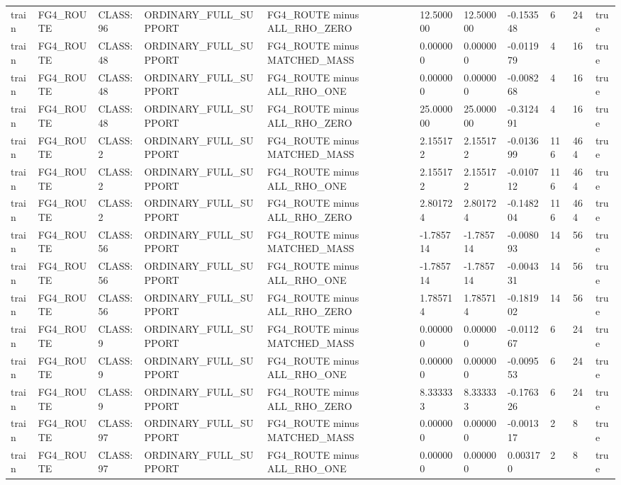 \begin{tabular}{lllllllllll}
train & FG4\_ROUTE & CLASS:96 & ORDINARY\_FULL\_SUPPORT & FG4\_ROUTE minus ALL\_RHO\_ZERO & 12.500000 & 12.500000 & -0.153548 & 6 & 24 & true \\
train & FG4\_ROUTE & CLASS:48 & ORDINARY\_FULL\_SUPPORT & FG4\_ROUTE minus MATCHED\_MASS & 0.000000 & 0.000000 & -0.011979 & 4 & 16 & true \\
train & FG4\_ROUTE & CLASS:48 & ORDINARY\_FULL\_SUPPORT & FG4\_ROUTE minus ALL\_RHO\_ONE & 0.000000 & 0.000000 & -0.008268 & 4 & 16 & true \\
train & FG4\_ROUTE & CLASS:48 & ORDINARY\_FULL\_SUPPORT & FG4\_ROUTE minus ALL\_RHO\_ZERO & 25.000000 & 25.000000 & -0.312491 & 4 & 16 & true \\
train & FG4\_ROUTE & CLASS:2 & ORDINARY\_FULL\_SUPPORT & FG4\_ROUTE minus MATCHED\_MASS & 2.155172 & 2.155172 & -0.013699 & 116 & 464 & true \\
train & FG4\_ROUTE & CLASS:2 & ORDINARY\_FULL\_SUPPORT & FG4\_ROUTE minus ALL\_RHO\_ONE & 2.155172 & 2.155172 & -0.010712 & 116 & 464 & true \\
train & FG4\_ROUTE & CLASS:2 & ORDINARY\_FULL\_SUPPORT & FG4\_ROUTE minus ALL\_RHO\_ZERO & 2.801724 & 2.801724 & -0.148204 & 116 & 464 & true \\
train & FG4\_ROUTE & CLASS:56 & ORDINARY\_FULL\_SUPPORT & FG4\_ROUTE minus MATCHED\_MASS & -1.785714 & -1.785714 & -0.008093 & 14 & 56 & true \\
train & FG4\_ROUTE & CLASS:56 & ORDINARY\_FULL\_SUPPORT & FG4\_ROUTE minus ALL\_RHO\_ONE & -1.785714 & -1.785714 & -0.004331 & 14 & 56 & true \\
train & FG4\_ROUTE & CLASS:56 & ORDINARY\_FULL\_SUPPORT & FG4\_ROUTE minus ALL\_RHO\_ZERO & 1.785714 & 1.785714 & -0.181902 & 14 & 56 & true \\
train & FG4\_ROUTE & CLASS:9 & ORDINARY\_FULL\_SUPPORT & FG4\_ROUTE minus MATCHED\_MASS & 0.000000 & 0.000000 & -0.011267 & 6 & 24 & true \\
train & FG4\_ROUTE & CLASS:9 & ORDINARY\_FULL\_SUPPORT & FG4\_ROUTE minus ALL\_RHO\_ONE & 0.000000 & 0.000000 & -0.009553 & 6 & 24 & true \\
train & FG4\_ROUTE & CLASS:9 & ORDINARY\_FULL\_SUPPORT & FG4\_ROUTE minus ALL\_RHO\_ZERO & 8.333333 & 8.333333 & -0.176326 & 6 & 24 & true \\
train & FG4\_ROUTE & CLASS:97 & ORDINARY\_FULL\_SUPPORT & FG4\_ROUTE minus MATCHED\_MASS & 0.000000 & 0.000000 & -0.001317 & 2 & 8 & true \\
train & FG4\_ROUTE & CLASS:97 & ORDINARY\_FULL\_SUPPORT & FG4\_ROUTE minus ALL\_RHO\_ONE & 0.000000 & 0.000000 & 0.003170 & 2 & 8 & true \\

\end{tabular}

